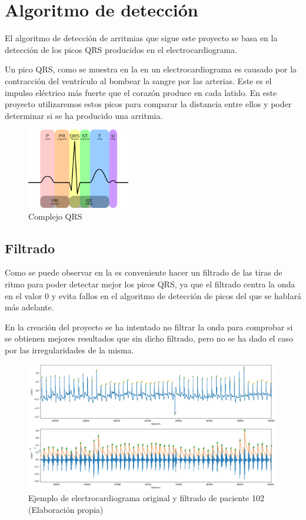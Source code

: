 \section{Algoritmo de detección}
El algoritmo de detección de arritmias que sigue este proyecto se basa en la detección de 
los picos QRS producidos en el electrocardiograma.

Un pico QRS, como se muestra en la  en un electrocardiograma es causado por la contracción del ventrículo al bombear la sangre por las arterias. Este es el impulso eléctrico más fuerte que el corazón produce en cada latido. En este proyecto utilizaremos estos picos para comparar la distancia entre ellos y poder determinar si se ha producido una arritmia. 

\begin{figure}[h]
	\centering
	\includegraphics[width=0.4\textwidth]{./Images/img_introduccion/complejoQRS.png}
	\caption[Complejo QRS]{Complejo QRS \cite{desai2021low}}
	\label{fig:complejoQRS}
\end{figure}

\subsection{Filtrado}
Como se puede observar en la  es conveniente hacer un filtrado de las tiras de ritmo para poder detectar mejor los picos QRS, ya que el filtrado centra la onda en el valor 0 y evita fallos en el algoritmo de detección de picos del que se hablará más adelante. 

En la creación del proyecto se ha intentado no filtrar la onda para comprobar si se obtienen mejores resultados que sin dicho filtrado, pero no se ha dado el caso por las irregularidades de la misma.

\begin{figure}[h!]
	\centering
	\includegraphics[width=0.99\textwidth]{./Images/img_introduccion/102filtrado_y_sin_filtrar.png}
	\caption{Ejemplo de electrocardiograma original y filtrado de paciente 102 (Elaboración propia)}
	\label{fig:102filtradoysinfiltrar}
\end{figure}

